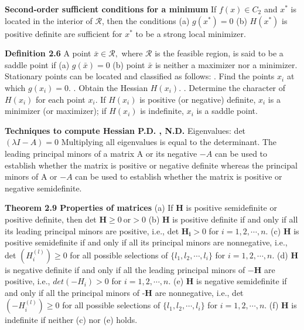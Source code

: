 \begin{multicols}{3}
\textbf{Second-order sufficient conditions for a minimum} \newline %
If $f(x) \in C_2$
and $x^*$ is located in the interior of $\mathcal{R}$, then the conditions
(a) $g(x^*) = 0$
(b) $H(x^*)$ is positive definite
are sufficient for $x^*$ to be a strong local minimizer. \newline

\textbf{Definition 2.6} \newline
A point $\bar{x} \in \mathcal{R},$ where $\mathcal{R}$ is the feasible region, is said to be a saddle point if \newline
(a) $g(\bar{x}) = 0$ \newline
(b) point $\bar{x}$ is neither a maximizer nor a minimizer. \hfill \break \newline
Stationary points can be located and classified as follows: . Find the points $x_i$ at which $g(x_i) = 0$. . Obtain the Hessian $H(x_i)$. . Determine the character of $H(x_i)$ for each point $x_i$. \newline
If $H(x_i)$ is positive (or negative) definite, $x_i$ is a minimizer (or maximizer);
if $H(x_i)$ is indefinite, $x_i$ is a saddle point. 

\textbf{Techniques to compute Hessian P.D. , N.D. } \newline
Eigenvalues: det $ (\lambda I -A) = 0$ Multiplying all eigenvalues is equal to the determinant. \newline
The leading principal minors of a matrix A or its negative $-A$ can be used to
establish whether the matrix is positive or negative definite whereas the principal
minors of A or $-A$ can be used to establish whether the matrix is positive or
negative semidefinite. \newline 

\textbf{Theorem 2.9 Properties of matrices} \newline 
(a) If \textbf{H} is positive semidefinite or positive definite, then
det $\mathbf{H} \geq 0  \ \text{or} > 0$ \newline 
(b) \textbf{H} is positive definite if and only if all its leading principal minors are
positive, i.e., det $\mathbf{H_i} > 0$ for $ i = 1, 2, \cdots , n.$ \newline 
(c) \textbf{H} is positive semidefinite if and only if all its principal minors are nonnegative, i.e., det $(H_i^{(l)}) \geq 0$ for all possible selections of $\{l_1, l_2, \cdots , l_i \}$
for $i = 1, 2, \cdots, n$. \newline 
(d) \textbf{H} is negative definite if and only if all the leading principal minors of
$-\mathbf{H}$ are positive, i.e., $det ( -H_i) > 0$ for $i = 1, 2, \cdots, n$. \newline 
(e) \textbf{H} is negative semidefinite if and only if all the principal minors of -$\mathbf{H}$
are nonnegative, i.e., det $(-H_i^{(l)}) \geq 0$ for all possible selections of
$\{l_1, l_2, \cdots , l_i \}$ for $i = 1, 2, \cdots , n$. \newline 
(f) \textbf{H} is indefinite if neither (c) nor (e) holds. 


\end{multicols}
